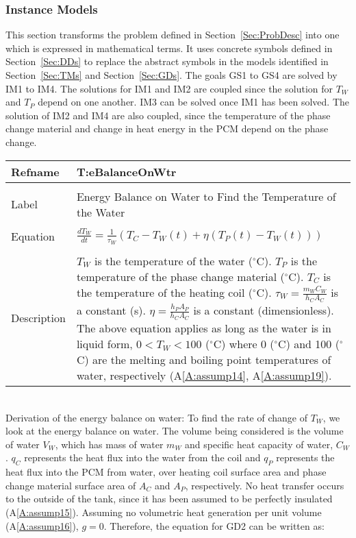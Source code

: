 \documentclass[12pt]{article}
\begin{document}
\subsubsection{Instance Models}
\label{Sec:IMs}
This section transforms the problem defined in Section~\ref{Sec:ProbDesc} into one which is expressed in mathematical terms. It uses concrete symbols defined in Section~\ref{Sec:DDs} to replace the abstract symbols in the models identified in Section~\ref{Sec:TMs} and Section~\ref{Sec:GDs}.
The goals GS1 to GS4 are solved by IM1 to IM4. The solutions for IM1 and IM2 are coupled since the solution for ${T_{W}}$ and ${T_{P}}$ depend on one another. IM3 can be solved once IM1 has been solved. The solution of IM2 and IM4 are also coupled, since the temperature of the phase change material and change in heat energy in the PCM depend on the phase change.
~\newline
\noindent \begin{minipage}{\textwidth}
\begin{tabular}{p{} p{}}
\toprule \textbf{Refname} & \textbf{T:eBalanceOnWtr}
\label{T:eBalanceOnWtr}
\\ \midrule \\
Label & Energy Balance on Water to Find the Temperature of the Water
\\ \midrule \\
Equation & $\frac{d {T_{W}}}{d t}=\frac{1}{{\tau{}_{W}}} \left({T_{C}}-{T_{W}}\left(t\right)+\eta{} \left({T_{P}}\left(t\right)-{T_{W}}\left(t\right)\right)\right)$
\\ \midrule \\
Description & ${T_{W}}$ is the temperature of the water (${}^{\circ}$C). ${T_{P}}$ is the temperature of the phase change material (${}^{\circ}$C). ${T_{C}}$ is the temperature of the heating coil (${}^{\circ}$C). ${\tau{}_{W}}=\frac{{m_{W}} {C_{W}}}{{h_{C}} {A_{C}}}$ is a constant (s). $\eta{}=\frac{{h_{P}} {A_{P}}}{{h_{C}} {A_{C}}}$ is a constant (dimensionless). The above equation applies as long as the water is in liquid form, $0<{T_{W}}<100$ (${}^{\circ}$C) where 0 (${}^{\circ}$C) and 100 (${}^{\circ}$C) are the melting and boiling point temperatures of water, respectively (A\ref{A:assump14}, A\ref{A:assump19}).
\\ \bottomrule \end{tabular}
\end{minipage}\\
Derivation of the energy balance on water:
To find the rate of change of ${T_{W}}$, we look at the energy balance on water. The volume being considered is the volume of water ${V_{W}}$, which has mass of water ${m_{W}}$ and specific heat capacity of water, ${C_{W}}$. ${q_{C}}$ represents the heat flux into the water from the coil and ${q_{P}}$ represents the heat flux into the PCM from water, over heating coil surface area and phase change material surface area of ${A_{C}}$ and ${A_{P}}$, respectively. No heat transfer occurs to the outside of the tank, since it has been assumed to be perfectly insulated (A\ref{A:assump15}). Assuming no volumetric heat generation per unit volume (A\ref{A:assump16}), $g=0$. Therefore, the equation for GD2 can be written as:
\end{document}
